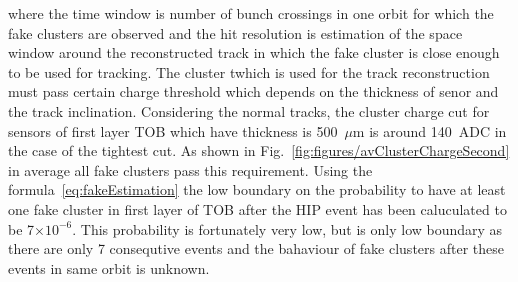 where the time window is number of bunch crossings in one orbit for which the fake clusters are observed and the hit resolution is estimation of the space window around the reconstructed track in which the fake cluster is close enough to be used for tracking. The cluster twhich is used for the track reconstruction must pass certain charge threshold which depends on the thickness of senor and the track inclination. Considering the normal tracks, the cluster charge cut for sensors of first layer TOB which have thickness is 500~$\mu$m is around 140~ADC in the case of the tightest cut. As shown in Fig.~\ref{fig:figures/avClusterChargeSecond} in average all fake clusters pass this requirement. Using the formula~\ref{eq:fakeEstimation} the low boundary on the probability to have at least one fake cluster in first layer of TOB after the HIP event has been caluculated to be 7$\times 10^{-6}$. This probability is fortunately very low, but is only low boundary as there are only 7 consequtive events and the bahaviour of fake clusters after these events in same orbit is unknown.



